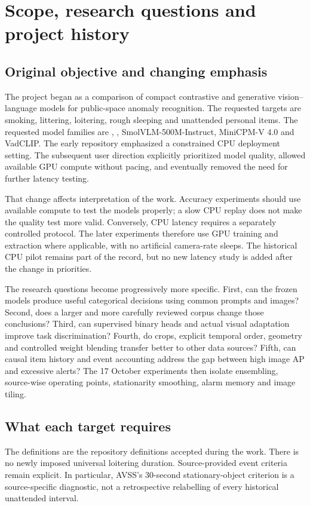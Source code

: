 \chapter{Scope, research questions and project history}
\label{ch:scope}
\section{Original objective and changing emphasis}
The project began as a comparison of compact contrastive and generative vision--language models for public-space anomaly recognition. The requested targets are smoking, littering, loitering, rough sleeping and unattended personal items. The requested model families are \modelm, \capstonesig, SmolVLM-500M-Instruct, MiniCPM-V 4.0 and VadCLIP. The early repository emphasized a constrained CPU deployment setting. The subsequent user direction explicitly prioritized model quality, allowed available GPU compute without pacing, and eventually removed the need for further latency testing.

That change affects interpretation of the work. Accuracy experiments should use available compute to test the models properly; a slow CPU replay does not make the quality test more valid. Conversely, CPU latency requires a separately controlled protocol. The later experiments therefore use GPU training and extraction where applicable, with no artificial camera-rate sleeps. The historical CPU pilot remains part of the record, but no new latency study is added after the change in priorities.

The research questions become progressively more specific. First, can the frozen models produce useful categorical decisions using common prompts and images? Second, does a larger and more carefully reviewed corpus change those conclusions? Third, can supervised binary heads and actual visual adaptation improve task discrimination? Fourth, do crops, explicit temporal order, geometry and controlled weight blending transfer better to other data sources? Fifth, can causal item history and event accounting address the gap between high image AP and excessive alerts? The 17 October experiments then isolate ensembling, source-wise operating points, stationarity smoothing, alarm memory and image tiling.

\section{What each target requires}

The definitions are the repository definitions accepted during the work. There is no newly imposed universal loitering duration. Source-provided event criteria remain explicit. In particular, AVSS's 30-second stationary-object criterion is a source-specific diagnostic, not a retrospective relabelling of every historical unattended interval.

